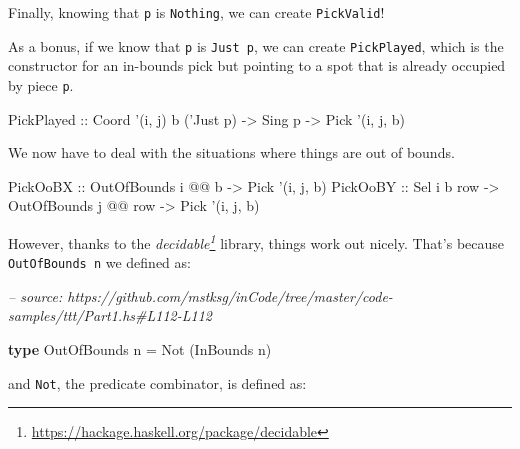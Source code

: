 \documentclass[]{article}
\newenvironment{Shaded}{}{}
\newcommand{\CommentTok}[1]{\textcolor[rgb]{0.38,0.63,0.69}{\textit{#1}}}
\newcommand{\DataTypeTok}[1]{\textcolor[rgb]{0.56,0.13,0.00}{#1}}
\newcommand{\FunctionTok}[1]{\textcolor[rgb]{0.02,0.16,0.49}{#1}}
\newcommand{\KeywordTok}[1]{\textcolor[rgb]{0.00,0.44,0.13}{\textbf{#1}}}
\newcommand{\NormalTok}[1]{#1}
\newcommand{\OtherTok}[1]{\textcolor[rgb]{0.00,0.44,0.13}{#1}}
\renewcommand{\href}[2]{#2\footnote{\url{#1}}}
\begin{document}
Finally, knowing that \texttt{p} is \texttt{\textquotesingle{}Nothing}, we can
create \texttt{PickValid}!

As a bonus, if we know that \texttt{p} is \texttt{\textquotesingle{}Just\ p}, we
can create \texttt{PickPlayed}, which is the constructor for an in-bounds pick
but pointing to a spot that is already occupied by piece
\texttt{p\textquotesingle{}}.

\begin{Shaded}
\begin{Highlighting}[]
\DataTypeTok{PickPlayed}\OtherTok{ ::} \DataTypeTok{Coord}\NormalTok{ '(i, j) b ('}\DataTypeTok{Just}\NormalTok{ p)}
           \OtherTok{->} \DataTypeTok{Sing}\NormalTok{ p}
           \OtherTok{->} \DataTypeTok{Pick}\NormalTok{ '(i, j, b)}
\end{Highlighting}
\end{Shaded}

We now have to deal with the situations where things are out of bounds.

\begin{Shaded}
\begin{Highlighting}[]
\DataTypeTok{PickOoBX}\OtherTok{ ::} \DataTypeTok{OutOfBounds}\NormalTok{ i }\FunctionTok{@@}\NormalTok{ b}
         \OtherTok{->} \DataTypeTok{Pick}\NormalTok{ '(i, j, b)}
\DataTypeTok{PickOoBY}\OtherTok{ ::} \DataTypeTok{Sel}\NormalTok{ i b row}
         \OtherTok{->} \DataTypeTok{OutOfBounds}\NormalTok{ j }\FunctionTok{@@}\NormalTok{ row}
         \OtherTok{->} \DataTypeTok{Pick}\NormalTok{ '(i, j, b)}
\end{Highlighting}
\end{Shaded}

However, thanks to the
\emph{\href{https://hackage.haskell.org/package/decidable}{decidable}} library,
things work out nicely. That's because \texttt{OutOfBounds\ n} we defined as:

\begin{Shaded}
\begin{Highlighting}[]
\CommentTok{-- source: https://github.com/mstksg/inCode/tree/master/code-samples/ttt/Part1.hs#L112-L112}

\KeywordTok{type} \DataTypeTok{OutOfBounds}\NormalTok{ n }\FunctionTok{=} \DataTypeTok{Not}\NormalTok{ (}\DataTypeTok{InBounds}\NormalTok{ n)}
\end{Highlighting}
\end{Shaded}

and \texttt{Not}, the predicate combinator, is defined as:
\end{document}
